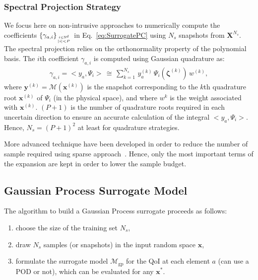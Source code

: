 \subsubsection{Spectral Projection Strategy}

We focus here on non-intrusive approaches to numerically compute the coefficients $\lbrace\gamma_{a,i}\rbrace_{i\in\mathbb{N}^d\atop |i|<P}$  in Eq.~\eqref{eq:SurrogatePC} using $N_{s}$ snapshots from $\mathbf{X}^{N_s}$. The spectral projection relies on the orthonormality property of the polynomial basis. The $i$th coefficient $\gamma_{a,i}$ is computed using Gaussian quadrature as:
\begin{align}
\gamma_{a,i} = <y_a,\Psi_i> \,\cong\,\displaystyle\sum_{k = 1}^{N_{s}}\,y_a^{(k)}\,\Psi_i(\boldsymbol{\zeta}^{(k)})\,w^{(k)},
\label{eq:pc_quadrature}
\end{align}
where $\mathbf{y}^{(k)} = \mathcal{M}(\mathbf{x}^{(k)})$ is the snapshot corresponding to the $k$th quadrature root $\mathbf{x}^{(k)}$ of $\Psi_i$ (in the physical space), and where $w^{k}$ is the weight associated with $\mathbf{x}^{(k)}$. $(P+1)$ is the number of quadrature roots required in each uncertain direction to ensure an accurate calculation of the integral $<y_a,\Psi_i>$. Hence, $N_{s} = (P+1)^2$ at least for quadrature strategies.

More advanced technique have been developed in order to reduce the number of sample required using sparse approach~\cite{blatman2009phd,LeMaitre2010,migliorati2013,Shao2017}. Hence, only the most important terms of the expansion are kept in order to lower the sample budget.


\subsection{Gaussian Process Surrogate Model}\label{sec:GP}

The algorithm to build a Gaussian Process surrogate proceeds as follows:
\begin{enumerate}
\item choose the size of the training set $N_{s}$,
\item draw $N_{s}$ samples (or snapshots) in the input random space $\mathbf{x}$,
\item formulate the surrogate model $\mathcal{M}_{\text{gp}}$ for the QoI at each element $a$ (can use a POD or not), which can be evaluated for any $\mathbf{x}^*$.
\end{enumerate}


